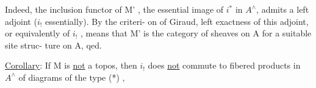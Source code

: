 Indeed,  the inclusion functor  of M' ,  the essential image of $i^{*}$
in $A^{\wedge}$,   admits a left adjoint ($i_{!}$  essentially).  By the criteri-%
on of Giraud,  left exactness of this adjoint,  or equivalently of $i_{!}$ ,
means that M' is the category of sheaves on A for a suitable site struc-%
ture on A,  qed.

\uline{Corollary}:  If M is \uline{not} a topos,  then $i_{!}$  does \uline{not}  commute to fibered
products  in $A^{\wedge}$ of diagrams of the type
(*)  ,

